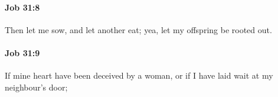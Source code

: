 		\paragraph{Job 31:8} %
			\label{JOB-31-8}

			Then let me sow, and let another eat; yea, let my offspring be rooted out.


		\paragraph{Job 31:9} %
			\label{JOB-31-9}

			If mine heart have been deceived by a woman, or if I have laid wait at my neighbour’s door;


